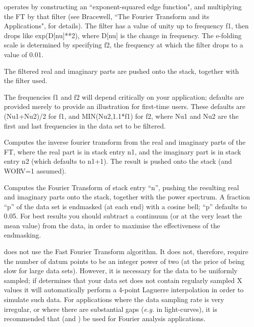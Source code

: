 \begin {description}
  operates by constructing an ``exponent-squared edge
function", and multiplying the FT by that filter (see Bracewell, ``The
Fourier Transform and its Applications", for details). The filter has
a value of unity up to frequency f1, then drops like exp(D[nu]**2),
where D[nu] is the change in frequency. The e-folding scale is
determined by specifying f2, the frequency at which the filter drops
to a value of 0.01.

The filtered real and imaginary parts are pushed onto the stack,
together with the filter used.

The frequencies f1 and f2 will depend critically on your application;
defaults are provided merely to provide an illustration for first-time
users. These defaults are (Nu1+Nu2)/2 for f1, and MIN(Nu2,1.1*f1) for
f2, where Nu1 and Nu2 are the first and last frequencies in the
data set to be filtered.

Computes the inverse fourier transform from the real and imaginary
parts of the FT, where the real part is in stack entry n1, and the
imaginary part is in stack entry n2 (which defaults to n1+1). The
result is pushed onto the stack (and WORV=1 assumed).

Computes the Fourier Transform of stack entry ``n'', pushing the
resulting real and imaginary parts onto the stack, together with the
power spectrum. A fraction ``p'' of the data set is endmasked (at each
end) with a cosine bell; ``p'' defaults to 0.05. For best results you
should subtract a continuum (or at the very least the mean value) from
the data, in order to maximise the effectiveness of the endmasking.

  does not use the Fast Fourier Transform algorithm. It does not,
therefore, require the number of datum points to be an integer power
of two (at the price of being slow for large data sets). However, it is
necessary for the data to be uniformly sampled; if   determines
that your data set does not contain regularly sampled X values it will
automatically perform a 4-point Laguerre interpolation in order to
simulate such data. For applications where the data sampling rate is
very irregular, or where there are substantial gaps ({\em e.g.} in
light-curves), it is recommended that   (and )  be used
for Fourier analysis applications.


\end{description}
